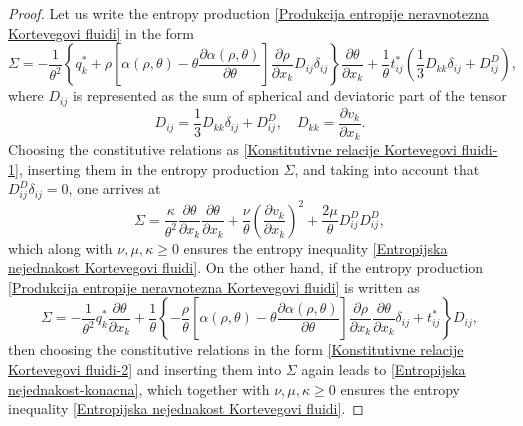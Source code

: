 \documentclass[a4paper,fleqn]{cas-sc}
\theoremstyle{definition}
\begin{document}
\begin{proof}
	Let us write the entropy production \eqref{Produkcija entropije neravnotezna Kortevegovi fluidi} in the form 
	\begin{equation*} 
		\Sigma = - \dfrac{1}{\theta^{2}} \left\{ q_{k}^{\ast} + \rho \left[ \alpha(\rho, \theta) 
		- \theta \dfrac{\partial \alpha(\rho, \theta)}{\partial \theta} \right] 
		\dfrac{\partial \rho}{\partial x_k} D_{ij} \delta_{ij} \right\} \dfrac{\partial \theta}{\partial x_k} 
		+ \dfrac{1}{\theta} t_{ij}^{\ast} \left( \frac{1}{3} D_{kk} \delta_{ij} + D_{ij}^{D} \right), 
	\end{equation*}
	where $D_{ij}$ is represented as the sum of spherical and deviatoric part of the tensor 
	\begin{equation*}
		D_{ij} = \frac{1}{3} D_{kk} \delta_{ij} + D_{ij}^{D}, \quad 
		D_{kk} = \dfrac{\partial v_k}{\partial x_k}. 
	\end{equation*} 
	Choosing the constitutive relations as \eqref{Konstitutivne relacije Kortevegovi fluidi-1}, inserting them in the entropy production $\Sigma$, and taking into account that $D_{ij}^{D} \delta_{ij} = 0$, one arrives at 
	\begin{equation} \label{Entropijska nejednakost-konacna}
		\Sigma = \dfrac{\kappa}{\theta^{2}} 
		\dfrac{\partial \theta}{\partial x_k} \dfrac{\partial \theta}{\partial x_k} 
		+ \dfrac{\nu}{\theta} \left( \dfrac{\partial v_k}{\partial x_k} \right)^{2}
		+ \dfrac{2 \mu}{\theta} D_{ij}^{D} D_{ij}^{D}, 
	\end{equation}
	which along with $\nu, \mu, \kappa \geq 0$ ensures the entropy inequality \eqref{Entropijska nejednakost Kortevegovi fluidi}. On the other hand, if the entropy production \eqref{Produkcija entropije neravnotezna Kortevegovi fluidi} is written as 
	\begin{equation*} 
		\Sigma = - \dfrac{1}{\theta^{2}} q_{k}^{\ast} \dfrac{\partial \theta}{\partial x_k} 
		+ \dfrac{1}{\theta} \left\{ 
		- \dfrac{\rho}{\theta} \left[ \alpha(\rho, \theta) 
		- \theta \dfrac{\partial \alpha(\rho, \theta)}{\partial \theta} \right] 
		\dfrac{\partial \rho}{\partial x_k} \dfrac{\partial \theta}{\partial x_k} \delta_{ij}
		+ t_{ij}^{\ast} \right\} D_{ij},  
	\end{equation*} 
	then choosing the constitutive relations in the form \eqref{Konstitutivne relacije Kortevegovi fluidi-2} and inserting them into $\Sigma$ again leads to \eqref{Entropijska nejednakost-konacna}, which together with $\nu, \mu, \kappa \geq 0$ ensures the entropy inequality \eqref{Entropijska nejednakost Kortevegovi fluidi}.
\end{proof}
\end{document}
